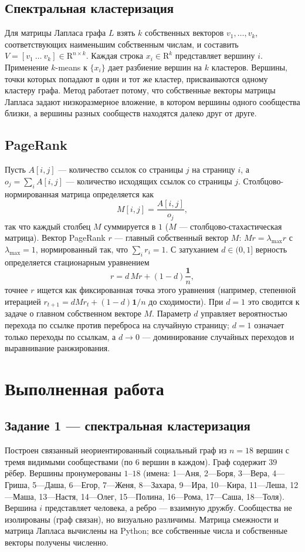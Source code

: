 \documentclass[12pt,a4paper]{article}
\begin{document}
\subsection{Спектральная кластеризация}
Для матрицы Лапласа графа $L$ взять $k$ собственных векторов $v_1,\dots,v_k$, соответствующих наименьшим собственным числам, и составить $V=[v_1\ \dots\ v_k]\in\mathrm{R}^{n\times k}$. Каждая строка $x_i\in\mathrm{R}^{k}$ представляет вершину $i$. Применение $k$-means к $\{x_i\}$ дает разбиение вершин на $k$ кластеров. Вершины, точки которых попадают в один и тот же кластер, присваиваются одному кластеру графа. Метод работает потому, что собственные векторы матрицы Лапласа задают низкоразмерное вложение, в котором вершины одного сообщества близки, а вершины разных сообществ находятся далеко друг от друге.

\subsection{PageRank}
Пусть $A[i,j]$ --- количество ссылок со страницы $j$ на страницу $i$, а $o_j=\sum_i A[i,j]$ --- количество исходящих ссылок со страницы $j$. Столбцово-нормированная матрица определяется как
\[
M[i,j]=\frac{A[i,j]}{o_j},
\]
так что каждый столбец $M$ суммируется в $1$ ($M$ --- столбцово-стахастическая матрица). Вектор PageRank $r$ --- главный собственный вектор $M$: $M r=\lambda_{\max} r$ с $\lambda_{\max}=1$, нормированный так, что $\sum_i r_i=1$. С затуханием $d\in(0,1]$ верность определяется стационарным уравнением
\[
r=d\,M r+(1-d)\frac{\mathbf{1}}{n},
\]
точнее $r$ ищется как фиксированная точка этого уравнения (например, степенной итерацией $r_{t+1}=dMr_t+(1-d)\mathbf{1}/n$ до сходимости). При $d=1$ это сводится к задаче о главном собственном векторе $M$. Параметр $d$ управляет вероятностью перехода по ссылке против переброса на случайную страницу; $d=1$ означает только переходы по ссылкам, а $d\to0$ --- доминирование случайных переходов и выравнивание ранжирования.

\section{Выполненная работа}

\subsection{Задание 1 --- спектральная кластеризация}
Построен связанный неориентированный социальный граф из $n=18$ вершин с тремя видимыми сообществами (по $6$ вершин в каждом). Граф содержит $39$ рёбер. Вершины пронумерованы $1$--$18$ (имена: 1---Аня, 2---Боря, 3---Вера, 4---Гриша, 5---Даша, 6---Егор, 7---Женя, 8---Захара, 9---Ира, 10---Кира, 11---Леша, 12---Маша, 13---Настя, 14---Олег, 15---Полина, 16---Рома, 17---Саша, 18---Толя). Вершина $i$ представляет человека, а ребро --- взаимную дружбу. Сообщества не изолированы (граф связан), но визуально различимы. Матрица смежности и матрица Лапласа вычислены на Python; все собственные числа и собственные векторы получены численно.
\end{document}
